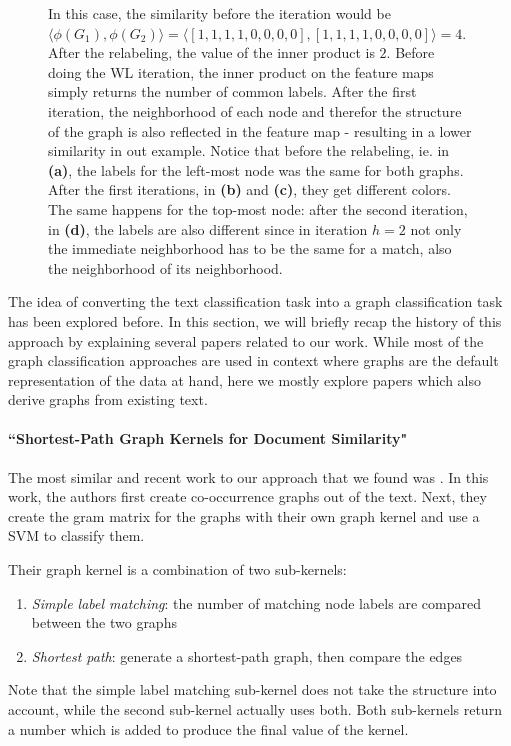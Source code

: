 \begin{figure}[htb!]
{  In this case, the similarity before the iteration would be $\langle \phi(G_1), \phi(G_2) \rangle = \langle [1, 1, 1, 1, 0, 0, 0, 0], [1, 1, 1, 1, 0, 0, 0, 0] \rangle = 4$. After the relabeling, the value of the inner product is $2$.
  Before doing the WL iteration, the inner product on the feature maps simply returns the number of common labels. After the first iteration, the neighborhood of each node and therefor the structure of the graph is also reflected in the feature map - resulting in a lower similarity in out example.
  Notice that before the relabeling, ie. in \textbf{(a)}, the labels for the left-most node was the same for both graphs. After the first iterations, in \textbf{(b)} and \textbf{(c)}, they get different colors.
  The same happens for the top-most node: after the second iteration, in \textbf{(d)}, the labels are also different since in iteration $h=2$ not only the immediate neighborhood has to be the same for a match, also the neighborhood of its neighborhood.}
	\label{fig:wl_example}
\end{figure}

The idea of converting the text classification task into a graph classification task has been explored before.
In this section, we will briefly recap the history of this approach by explaining several papers related to our work.
While most of the graph classification approaches are used in context where graphs are the default representation of the data at hand, here we mostly explore papers which also derive graphs from existing text.


\paragraph{``Shortest-Path Graph Kernels for Document Similarity" \cite{Nikolentzos2017a}}
The most similar and recent work to our approach that we found was \cite{Nikolentzos2017a}. In this work, the authors first create co-occurrence graphs out of the text. Next, they create the gram matrix for the graphs with their own graph kernel and use a SVM to classify them.

Their graph kernel is a combination of two sub-kernels:
\begin{enumerate}
    \item{\textit{Simple label matching}: the number of matching node labels are compared between the two graphs}
    \item{\textit{Shortest path}: generate a shortest-path graph, then compare the edges}
\end{enumerate}
Note that the simple label matching sub-kernel does not take the structure into account, while the second sub-kernel actually uses both.
Both sub-kernels return a number which is added to produce the final value of the kernel.

